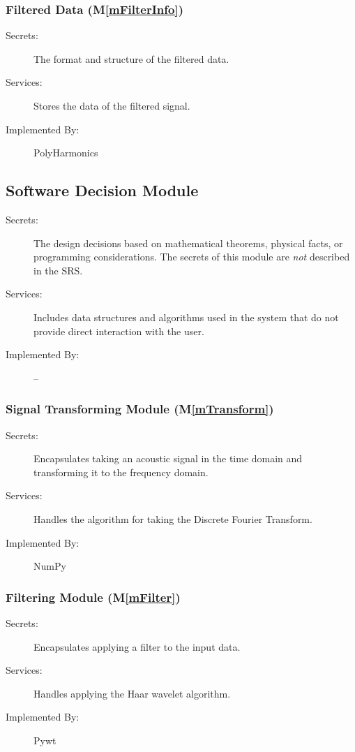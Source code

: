 \documentclass[12pt]{article}
\newcommand{\mref}[1]{M\ref{#1}}
\newcommand{\progname}{PolyHarmonics}
\begin{document}
\subsubsection{Filtered Data (\mref{mFilterInfo})}
\begin{description}
\item[Secrets:] The format and structure of the filtered data.
\item[Services:] Stores the data of the filtered signal.
\item[Implemented By:] \progname{}
\end{description}
\subsection{Software Decision Module}

\begin{description}
\item[Secrets:] The design decisions based on mathematical theorems, physical
  facts, or programming considerations. The secrets of this module are
  \emph{not} described in the SRS.
\item[Services:] Includes data structures and algorithms used in the system that
  do not provide direct interaction with the user. 
\item[Implemented By:] --
\end{description}

\subsubsection{Signal Transforming Module (\mref{mTransform})}

\begin{description}
\item[Secrets:] Encapsulates taking an acoustic signal in the time domain and 
transforming it to the frequency domain.
\item[Services:] Handles the algorithm for taking the Discrete Fourier 
Transform.
\item[Implemented By:] NumPy
\end{description}

\subsubsection{Filtering Module (\mref{mFilter})}
\begin{description}
\item[Secrets:] Encapsulates applying a filter to the input data.
\item[Services:] Handles applying the Haar wavelet algorithm.
\item[Implemented By:] Pywt
\end{description}
\end{document}
